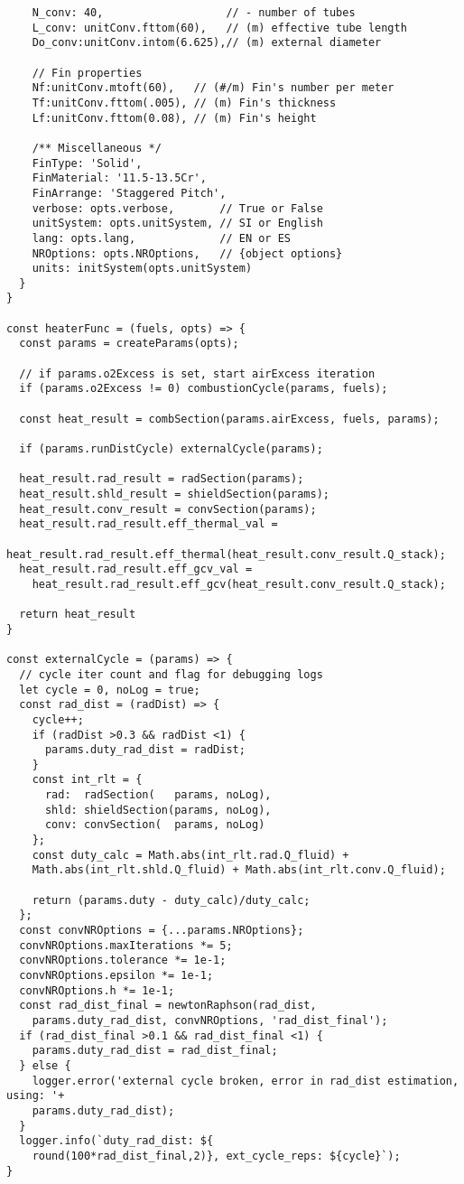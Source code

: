 \begin{verbatim}
    N_conv: 40,                   // - number of tubes 
    L_conv: unitConv.fttom(60),   // (m) effective tube length
    Do_conv:unitConv.intom(6.625),// (m) external diameter 

    // Fin properties
    Nf:unitConv.mtoft(60),   // (#/m) Fin's number per meter
    Tf:unitConv.fttom(.005), // (m) Fin's thickness
    Lf:unitConv.fttom(0.08), // (m) Fin's height

    /** Miscellaneous */
    FinType: 'Solid',
    FinMaterial: '11.5-13.5Cr',
    FinArrange: 'Staggered Pitch',
    verbose: opts.verbose,       // True or False
    unitSystem: opts.unitSystem, // SI or English
    lang: opts.lang,             // EN or ES
    NROptions: opts.NROptions,   // {object options}
    units: initSystem(opts.unitSystem)
  }
}

const heaterFunc = (fuels, opts) => {
  const params = createParams(opts);

  // if params.o2Excess is set, start airExcess iteration
  if (params.o2Excess != 0) combustionCycle(params, fuels);

  const heat_result = combSection(params.airExcess, fuels, params);

  if (params.runDistCycle) externalCycle(params);

  heat_result.rad_result = radSection(params);
  heat_result.shld_result = shieldSection(params);
  heat_result.conv_result = convSection(params);
  heat_result.rad_result.eff_thermal_val = 
    heat_result.rad_result.eff_thermal(heat_result.conv_result.Q_stack);
  heat_result.rad_result.eff_gcv_val = 
    heat_result.rad_result.eff_gcv(heat_result.conv_result.Q_stack);

  return heat_result
}

const externalCycle = (params) => {
  // cycle iter count and flag for debugging logs 
  let cycle = 0, noLog = true;
  const rad_dist = (radDist) => {
    cycle++;
    if (radDist >0.3 && radDist <1) {
      params.duty_rad_dist = radDist;
    }
    const int_rlt = {
      rad:  radSection(   params, noLog),
      shld: shieldSection(params, noLog),
      conv: convSection(  params, noLog)
    };
    const duty_calc = Math.abs(int_rlt.rad.Q_fluid) + 
    Math.abs(int_rlt.shld.Q_fluid) + Math.abs(int_rlt.conv.Q_fluid);

    return (params.duty - duty_calc)/duty_calc;
  };
  const convNROptions = {...params.NROptions};
  convNROptions.maxIterations *= 5;
  convNROptions.tolerance *= 1e-1;
  convNROptions.epsilon *= 1e-1;
  convNROptions.h *= 1e-1;
  const rad_dist_final = newtonRaphson(rad_dist, 
    params.duty_rad_dist, convNROptions, 'rad_dist_final');
  if (rad_dist_final >0.1 && rad_dist_final <1) { 
    params.duty_rad_dist = rad_dist_final; 
  } else {
    logger.error('external cycle broken, error in rad_dist estimation, using: '+
    params.duty_rad_dist);
  }
  logger.info(`duty_rad_dist: ${
    round(100*rad_dist_final,2)}, ext_cycle_reps: ${cycle}`);
}


\end{verbatim}
